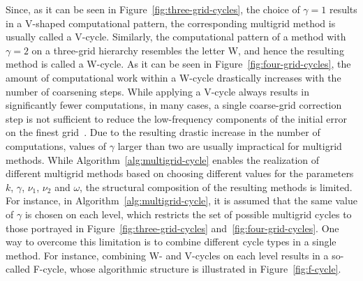 Since, as it can be seen in Figure~\ref{fig:three-grid-cycles}, the choice of $\gamma = 1$ results in a V-shaped computational pattern, the corresponding multigrid method is usually called a V-cycle.
Similarly, the computational pattern of a method with $\gamma = 2$ on a three-grid hierarchy resembles the letter W, and hence the resulting method is called a W-cycle.
As it can be seen in Figure~\ref{fig:four-grid-cycles}, the amount of computational work within a W-cycle drastically increases with the number of coarsening steps.
While applying a V-cycle always results in significantly fewer computations, in many cases, a single coarse-grid correction step is not sufficient to reduce the low-frequency components of the initial error on the finest grid~\cite{trottenberg2000multigrid}.
Due to the resulting drastic increase in the number of computations, values of $\gamma$ larger than two are usually impractical for multigrid methods.
While Algorithm~\ref{alg:multigrid-cycle} enables the realization of different multigrid methods based on choosing different values for the parameters $k$, $\gamma$, $\nu_1$, $\nu_2$ and $\omega$, the structural composition of the resulting methods is limited.
For instance, in Algorithm~\ref{alg:multigrid-cycle}, it is assumed that the same value of $\gamma$ is chosen on each level, which restricts the set of possible multigrid cycles to those portrayed in Figure~\ref{fig:three-grid-cycles} and~\ref{fig:four-grid-cycles}.
One way to overcome this limitation is to combine different cycle types in a single method.
For instance, combining W- and V-cycles on each level results in a so-called F-cycle, whose algorithmic structure is illustrated in Figure~\ref{fig:f-cycle}.
